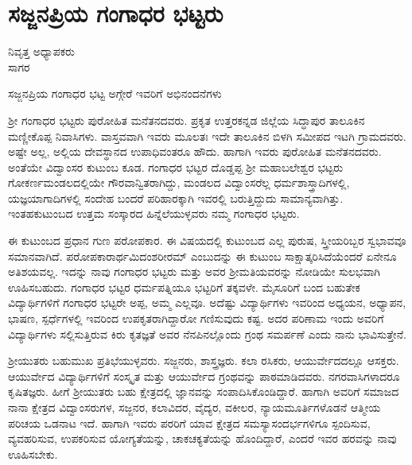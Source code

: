 {\fontsize{14}{16}\selectfont
\chapter{ಸಜ್ಜನಪ್ರಿಯ ಗಂಗಾಧರ ಭಟ್ಟರು}

\begin{center}
\smallskip

ನಿವೃತ್ತ ಅಧ್ಯಾಪಕರು\\ 
ಸಾಗರ
\addrule
\end{center}

ಸಜ್ಜನಪ್ರಿಯ ಗಂಗಾಧರ ಭಟ್ಟ ಅಗ್ಗೇರೆ ಇವರಿಗೆ ಅಭಿನಂದನೆಗಳು \enginline{-}
\vskip 3pt

ಶ್ರೀ ಗಂಗಾಧರ ಭಟ್ಟರು ಪುರೋಹಿತ ಮನೆತನದವರು. ಪ್ರಕೃತ  ಉತ್ತರಕನ್ನಡ ಜಿಲ್ಲೆಯ ಸಿದ್ಧಾಪುರ ತಾಲೂಕಿನ ಮಣ್ಣೀಕೊಪ್ಪ ನಿವಾಸಿಗಳು. ವಾಸ್ತವವಾಗಿ ಇವರು ಮೂಲತಃ ಇದೇ ತಾಲೂಕಿನ ಬಿಳಗಿ ಸಮೀಪದ ಇಟಗಿ ಗ್ರಾಮದವರು. ಅಷ್ಟೇ ಅಲ್ಲ, ಅಲ್ಲಿಯ ದೇವಸ್ಥಾನದ ಉಪಾಧಿವಂತರೂ ಹೌದು. ಹಾಗಾಗಿ ಇವರು ಪುರೋಹಿತ ಮನೆತನದವರು. ಅಂತೆಯೇ ವಿದ್ವಾಂಸರ ಕುಟುಂಬ ಕೂಡ. ಗಂಗಾಧರ ಭಟ್ಟರ ದೊಡ್ಡಪ್ಪ ಶ್ರೀ ಮಹಾಬಲೇಶ್ವರ ಭಟ್ಟರು ಗೋಕರ್ಣಮಂಡಲದಲ್ಲಿಯೇ ಗೌರವಾನ್ವಿತರಾಗಿದ್ದು, ಮಂಡಲದ ವಿದ್ವಾಂಸರೆಲ್ಲ ಧರ್ಮಶಾಸ್ತ್ರಾದಿಗಳಲ್ಲಿ, ಯಜ್ಞ\enginline{-}ಯಾಗಾದಿಗಳಲ್ಲಿ ಸಂದೇಹ ಬಂದರೆ ಪರಿಹಾರಕ್ಕಾಗಿ ಇವರಲ್ಲಿ ಬರುತ್ತಿದ್ದುದು ಸಾಮಾನ್ಯವಾಗಿತ್ತು. ಇಂತಹ\break ಕುಟುಂಬದ ಉತ್ತಮ ಸಂಸ್ಕಾರದ ಹಿನ್ನೆಲೆಯುಳ್ಳವರು ನಮ್ಮ ಗಂಗಾಧರ ಭಟ್ಟರು.
\vskip 3pt

ಈ ಕುಟುಂಬದ ಪ್ರಧಾನ ಗುಣ ಪರೋಪಕಾರ. ಈ ವಿಷಯದಲ್ಲಿ ಕುಟುಂಬದ ಎಲ್ಲ ಪುರುಷ, ಸ್ತ್ರೀಯರಿಬ್ಬರ ಸ್ವಭಾವವೂ ಸಮಾನವಾಗಿದೆ. ಪರೋಪಕಾರಾರ್ಥಮಿದಂ\break ಶರೀರಮ್ ಎಂಬುದನ್ನು ಈ ಕುಟುಂಬ ಸಾಕ್ಷಾತ್ಕರಿಸಿದೆಯೆಂದರೆ ಏನೇನೂ ಅತಿಶಯವಲ್ಲ. ಇದನ್ನು ನಾವು ಗಂಗಾಧರ ಭಟ್ಟರು ಮತ್ತು ಅವರ ಶ್ರೀಮತಿಯವರನ್ನು ನೋಡಿಯೇ ಸುಲಭವಾಗಿ ಊಹಿಸಬಹುದು. ಗಂಗಾಧರ ಭಟ್ಟರ ಧರ್ಮಪತ್ನಿಯೂ ಭಟ್ಟರಿಗೆ ತಕ್ಕವಳೇ. ಮೈಸೂರಿಗೆ ಬಂದ ಬಹುತೇಕ ವಿದ್ಯಾರ್ಥಿಗಳಿಗೆ ಗಂಗಾಧರ ಭಟ್ಟರೇ ಅಪ್ಪ, ಅಮ್ಮ ಎಲ್ಲವೂ. ಅದೆಷ್ಟು ವಿದ್ಯಾರ್ಥಿಗಳು ಇವರಿಂದ ಅಧ್ಯಯನ, ಅಧ್ಯಾಪನ, ಭಾಷಣ, ಸ್ಪರ್ಧೆಗಳಲ್ಲಿ ಇವರಿಂದ ಉಪಕೃತರಾಗಿದ್ದಾರೋ ಗಣಿಸುವುದು ಕಷ್ಟ. ಅದರ ಪರಿಣಾಮ ಇಂದು ಅವರಿಗೆ ವಿದ್ಯಾರ್ಥಿಗಳು ಸಲ್ಲಿಸುತ್ತಿರುವ ಕಿರು ಕೃತಜ್ಞತೆ   \enginline{-}   ಅವರ ನೆನಪಿನಲ್ಲೊಂದು ಗ್ರಂಥ ಸಮರ್ಪಣೆ ಎಂದು ನಾನು ಭಾವಿಸುತ್ತೇನೆ.
\vskip 3pt

ಶ್ರೀಯುತರು ಬಹುಮುಖ ಪ್ರತಿಭೆಯುಳ್ಳವರು. ಸಜ್ಜನರು, ಶಾಸ್ತ್ರಜ್ಞರು. ಕಲಾ ರಸಿಕರು, ಆಯುರ್ವೇದದಲ್ಲೂ ಆಸಕ್ತರು. ಆಯುರ್ವೇದ ವಿದ್ಯಾರ್ಥಿಗಳಿಗೆ ಸಂಸ್ಕೃತ ಮತ್ತು ಆಯುರ್ವೇದ ಗ್ರಂಥವನ್ನು ಪಾಠಮಾಡಿದವರು. ನಗರವಾಸಿಗಳಾದರೂ~ \hbox{ಕೃಷಿತಜ್ಞರು.} ಹೀಗೆ ಶ್ರೀಯುತರು ಬಹು ಕ್ಷೇತ್ರದಲ್ಲಿ ಜ್ಞಾನವನ್ನು ಸಂಪಾದಿಸಿಕೊಂಡಿದ್ದಾರೆ. ಹಾಗಾಗಿ ಅವರಿಗೆ ಸಮಾಜದ ನಾನಾ ಕ್ಷೇತ್ರದ ವಿದ್ವಾಂಸರುಗಳ, ಸಜ್ಜನರ, ಕಲಾವಿದರ, ವೈದ್ಯರ, ವಕೀಲರ, ನ್ಯಾಯಮೂರ್ತಿಗಳೊಡನೆ  ಆತ್ಮೀಯ ಪರಿಚಯ \enginline{-}  ಒಡನಾಟ ಇದೆ. ಹಾಗಾಗಿ ಇವರು ಪರರಿಗೆ ಯಾವ ಕ್ಷೇತ್ರದ ಸಮಸ್ಯಾ\enginline{-}ಸಂದರ್ಭಗಳಿಗೂ ಸ್ಪಂದಿಸುವ, ವ್ಯವಹರಿಸುವ, ಉಪಕರಿಸುವ ಯೋಗ್ಯತೆಯನ್ನು, ಚಾಕಚಕ್ಯತೆಯನ್ನು ಹೊಂದಿದ್ದಾರೆ, ಎಂದರೆ ಇವರ ಹರವನ್ನು ನಾವು ಊಹಿಸಬೇಕು.  

}
